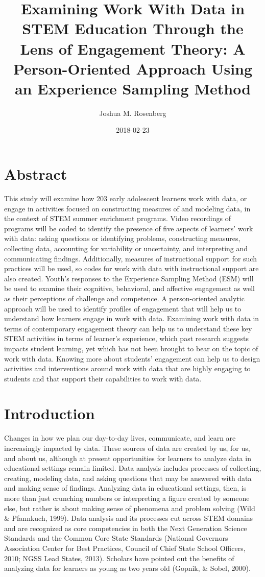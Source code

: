 \documentclass[]{book}
\title{Examining Work With Data in STEM Education Through the Lens of
Engagement Theory: A Person-Oriented Approach Using an Experience
Sampling Method}
\author{Joshua M. Rosenberg}
\date{2018-02-23}
\begin{document}
\maketitle

{
\setcounter{tocdepth}{1}
\tableofcontents
}
\chapter{Abstract}\label{abstract}

This study will examine how 203 early adolescent learners work with
data, or engage in activities focused on constructing measures of and
modeling data, in the context of STEM summer enrichment programs. Video
recordings of programs will be coded to identify the presence of five
aspects of learners' work with data: asking questions or identifying
problems, constructing measures, collecting data, accounting for
variability or uncertainty, and interpreting and communicating findings.
Additionally, measures of instructional support for such practices will
be used, so codes for work with data with instructional support are also
created. Youth's responses to the Experience Sampling Method (ESM) will
be used to examine their cognitive, behavioral, and affective engagement
as well as their perceptions of challenge and competence. A
person-oriented analytic approach will be used to identify profiles of
engagement that will help us to understand how learners engage in work
with data. Examining work with data in terms of contemporary engagement
theory can help us to understand these key STEM activities in terms of
learner's experience, which past research suggests impacts student
learning, yet which has not been brought to bear on the topic of work
with data. Knowing more about students' engagement can help us to design
activities and interventions around work with data that are highly
engaging to students and that support their capabilities to work with
data.

\chapter{Introduction}\label{intro-placemarker}

Changes in how we plan our day-to-day lives, communicate, and learn are
increasingly impacted by data. These sources of data are created by us,
for us, and about us, although at present opportunities for learners to
analyze data in educational settings remain limited. Data analysis
includes processes of collecting, creating, modeling data, and asking
questions that may be answered with data and making sense of findings.
Analyzing data in educational settings, then, is more than just
crunching numbers or interpreting a figure created by someone else, but
rather is about making sense of phenomena and problem solving (Wild \&
Pfannkuch, 1999). Data analysis and its processes cut across STEM
domains and are recognized as core competencies in both the Next
Generation Science Standards and the Common Core State Standards
(National Governors Association Center for Best Practices, Council of
Chief State School Officers, 2010; NGSS Lead States, 2013). Scholars
have pointed out the benefits of analyzing data for learners as young as
two years old (Gopnik, \& Sobel, 2000).
\end{document}
